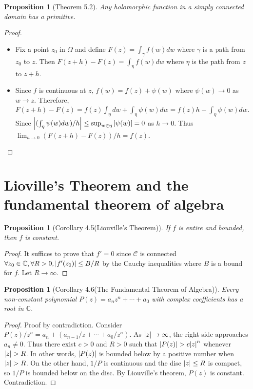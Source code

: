 \documentclass[12pt, psamsfonts]{amsart}
\newtheorem{prop}[thm]{Proposition}
\theoremstyle{definition}
\theoremstyle{remark}
\numberwithin{equation}{section}
\begin{document}
\begin{prop}[Theorem 5.2]
  Any holomorphic function in a simply connected domain has a primitive.
\end{prop}

\begin{proof}
  $ $
  \begin{itemize}
    \item
      Fix a point $z_0$ in $\Omega$ and define $F(z) = \int_{\gamma}f(w)dw$ where $\gamma$ is a path from $z_0$ to $z$.
      Then $F(z + h) - F(z) = \int_{\eta} f(w)dw$ where $\eta$ is the path from $z$ to $z + h$.
    \item
      Since $f$ is continuous at $z$, $f(w) = f(z) + \psi(w)$ where $\psi(w) \rightarrow 0$ as $w \rightarrow z$.
      Therefore, $F(z + h) - F(z) = f(z)\int_{\eta}dw + \int_{\eta} \psi(w)dw = f(z)h + \int_{\eta} \psi(w)dw$.
      Since $\abs{(\int_{\eta} \psi(w) dw) / h} \leq \sup_{w \in \eta} \abs{\psi(w)} = 0$ as $h \rightarrow 0$.
      Thus $\lim_{h \rightarrow 0} (F(z + h) - F(z)) / h = f(z)$.
  \end{itemize}
\end{proof}

\section{Lioville’s Theorem and the fundamental theorem of algebra}

\begin{prop}[Corollary 4.5(Liouville's Theorem)]
  If $f$ is entire and bounded, then $f$ is constant.
\end{prop}

\begin{proof}
  It suffices to prove that $f' = 0$ since $\mathcal{C}$ is connected
  $\forall z_0 \in \mathbb{C}, \forall R > 0, \abs{f'(z_0)} \leq B  / R$ by the Cauchy inequalities where $B$ is a bound for $f$.
  Let $R \rightarrow \infty$.
\end{proof}

\begin{prop}[Corollary 4.6(The Fundamental Theorem of Algebra)]
  Every non-constant polynomial $P(z) = a_nz^n + \cdots + a_0$ with complex coefficients has a root in $\mathbb{C}$.
\end{prop}

\begin{proof}
  Proof by contradiction.
  Consider $P(z) / z^n = a_n + (a_{n - 1} / z + \cdots + a_0 / z^n)$.
  As $\abs{z} \rightarrow \infty$, the right side approaches $a_n \ne 0$.
  Thus there exist $c > 0$ and $R > 0$ such that $\abs{P(z)} > c\abs{z}^n$ whenever $\abs{z} > R$.
  In other words, $\abs{P(z)}$ is bounded below by a positive number when $\abs{z} > R$.
  On the other hand, $1 / P$ is continuous and the disc $\abs{z} \leq R$ is compact, so $1 / P$ is bounded below on the disc.
  By Liouville's theorem, $P(z)$ is constant.
  Contradiction.
\end{proof}
\end{document}

